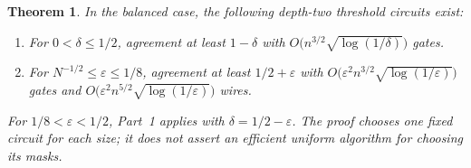 \documentclass[11pt,letterpaper]{article}
\newtheorem{theorem}{Theorem}
\theoremstyle{remark}
\begin{document}
\begin{theorem}\label{thm:avgupper}
In the balanced case, the following depth-two threshold circuits exist:
\begin{enumerate}
\item For $0<\delta\le1/2$, agreement at least $1-\delta$ with
      $O\bigl(n^{3/2}\sqrt{\log(1/\delta)}\bigr)$ gates.
\item For $N^{-1/2}\le\varepsilon\le1/8$, agreement at least
      $1/2+\varepsilon$ with
      $O\bigl(\varepsilon^2n^{3/2}\sqrt{\log(1/\varepsilon)}\bigr)$ gates
      and $O\bigl(\varepsilon^2n^{5/2}\sqrt{\log(1/\varepsilon)}\bigr)$ wires.
\end{enumerate}
For $1/8<\varepsilon<1/2$, Part~1 applies with $\delta=1/2-\varepsilon$.
The proof chooses one fixed circuit for each size; it does not assert an
efficient uniform algorithm for choosing its masks.
\end{theorem}
\end{document}
